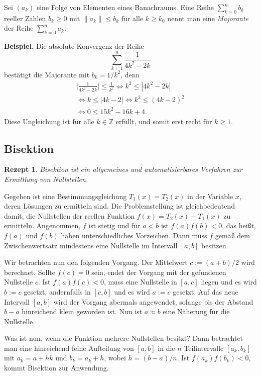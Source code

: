 \documentclass[a4paper,10pt,fleqn,twocolumn,twoside,dvipdfmx]{scrartcl}
\theoremstyle{rmbox}
\newtheorem{Rezept}{Rezept}[section]
\newcommand{\strong}[1]{\textsf{\textbf{#1}}}
\newcommand{\Z}{\mathbb Z}
\begin{document}
\noindent
Sei $(a_k)$ eine Folge von Elementen eines Banachraums.
Eine Reihe $\sum_{k=0}^n b_k$ reeller Zahlen $b_k\ge 0$ mit
$\|a_k\|\le b_k$ für alle $k\ge k_0$ nennt man eine \emph{Majorante}
der Reihe $\sum_{k=0}^n a_k$.

\strong{Beispiel.} Die absolute Konvergenz der Reihe
\[\sum_{k=1}^n\frac{1}{4k^2-2k}\]
bestätigt die Majorante mit $b_k=1/k^2$, denn
\begin{gather*}
\Big|\frac{1}{4k^2-2k}\Big| \le \frac{1}{k^2}\iff k^2\le |4k^2-2k|\\
\iff k\le |4k-2| \iff k^2 \le (4k-2)^2\\
\iff 0\le 15k^2-16k+4.
\end{gather*}
Diese Ungleichung ist für alle $k\in\Z$ erfüllt, und somit erst recht
für $k\ge 1$.

\subsection{Bisektion}

\begin{Rezept}
Bisektion ist ein allgemeines und automatisierbares
Verfahren zur Ermittlung von Nullstellen.
\end{Rezept}

\noindent
Gegeben ist eine Bestimmungsgleichung $T_1(x)=T_2(x)$ in der
Variable $x$, deren Lösungen zu ermitteln sind. Die Problemstellung
ist gleichbedeutend damit, die Nullstellen der reellen Funktion
$f(x)=T_2(x)-T_1(x)$ zu ermitteln. Angenommen, $f$ ist stetig
und für $a<b$ ist $f(a)f(b)<0$, das heißt, $f(a)$ und $f(b)$ haben
unterschiedliches Vorzeichen. Dann muss $f$ gemäß dem Zwischenwertsatz
mindestens eine Nullstelle im Intervall $[a,b]$ besitzen.

Wir betrachten nun den folgenden Vorgang. Der Mittelwert $c := (a+b)/2$
wird berechnet. Sollte $f(c)=0$ sein, endet der Vorgang mit der
gefundenen Nullstelle $c$. Ist $f(a)f(c)<0$, muss eine Nullstelle
in $[a,c]$ liegen und es wird $b:=c$ gesetzt, andernfalls in $[c,b]$
und es wird $a:=c$ gesetzt. Auf das neue Intervall $[a,b]$ wird der Vorgang
abermals angewendet, solange bis der Abstand $b-a$ hinreichend klein
geworden ist. Nun ist $a\approx b$ eine Näherung für die
Nullstelle.

Was ist nun, wenn die Funktion mehrere Nullstellen besitzt?
Dann betrachtet man eine hinreichend feine Aufteilung von $[a,b]$ in
die $n$ Teilintervalle $[a_k,b_k]$ mit $a_k=a+hk$ und $b_k=a_k+h$, wobei
$h=(b-a)/n$. Ist $f(a_k)f(b_k)<0$, kommt Bisektion zur
Anwendung.
\end{document}
